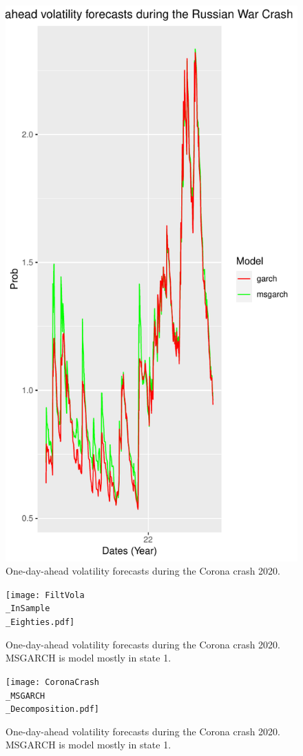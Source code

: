 \documentclass[11pt,a4paper]{article}
\begin{document}
\begin{figure}[h]
\includegraphics[width=0.8\linewidth]{pforecast-russia-crash.pdf}
\caption{One-day-ahead volatility forecasts during the Corona crash 2020.}
\end{figure}

\begin{figure}[h]
\texttt{[image: FiltVola\\\_InSample\\\_Eighties.pdf]}
\caption{One-day-ahead volatility forecasts during the Corona crash 2020. MSGARCH is model mostly in state 1.}
\end{figure}

\begin{figure}[h]
\texttt{[image: CoronaCrash\\\_MSGARCH\\\_Decomposition.pdf]}
\caption{One-day-ahead volatility forecasts during the Corona crash 2020. MSGARCH is model mostly in state 1.}
\label{img:cor-decomp}
\end{figure}
\end{document}

